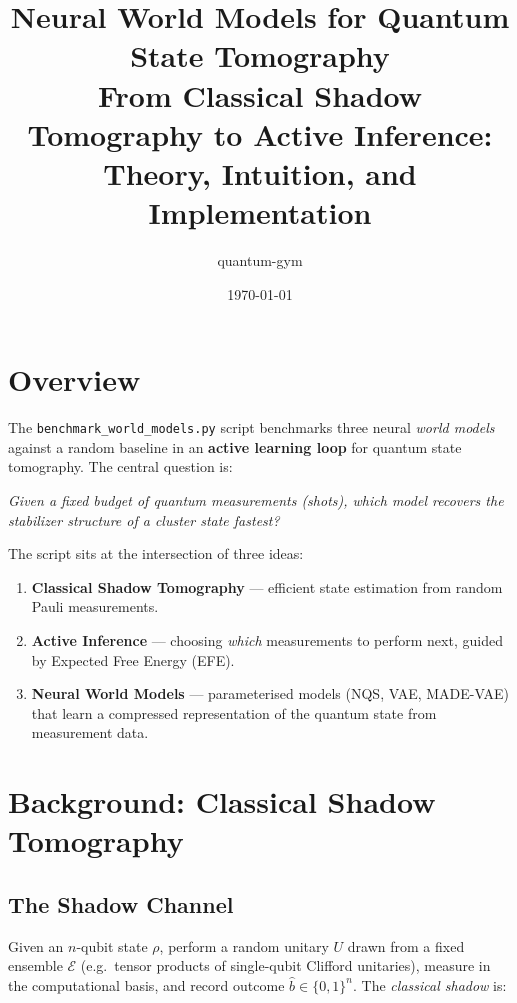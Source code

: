 \documentclass[11pt, a4paper]{article}
\title{
  \textbf{Neural World Models for Quantum State Tomography}\\
  \large From Classical Shadow Tomography to Active Inference:\\
  Theory, Intuition, and Implementation
}
\author{quantum-gym}
\date{\today}
\begin{document}
\maketitle
\tableofcontents
\newpage

\section{Overview}

The \texttt{benchmark\_world\_models.py} script benchmarks three neural
\emph{world models} against a random baseline in an \textbf{active learning
loop} for quantum state tomography. The central question is:

\begin{center}
\textit{Given a fixed budget of quantum measurements (shots), which model
recovers the stabilizer structure of a cluster state fastest?}
\end{center}

The script sits at the intersection of three ideas:
\begin{enumerate}
  \item \textbf{Classical Shadow Tomography} — efficient state estimation from
        random Pauli measurements.
  \item \textbf{Active Inference} — choosing \emph{which} measurements to
        perform next, guided by Expected Free Energy (EFE).
  \item \textbf{Neural World Models} — parameterised models
        (NQS, VAE, MADE-VAE) that learn a compressed representation of the
        quantum state from measurement data.
\end{enumerate}

\section{Background: Classical Shadow Tomography}

\subsection{The Shadow Channel}

Given an $n$-qubit state $\rho$, perform a random unitary $U$ drawn from a
fixed ensemble $\mathcal{E}$ (e.g.\ tensor products of single-qubit Clifford
unitaries), measure in the computational basis, and record outcome
$\hat{b} \in \{0,1\}^n$. The \emph{classical shadow} is:
\end{document}
